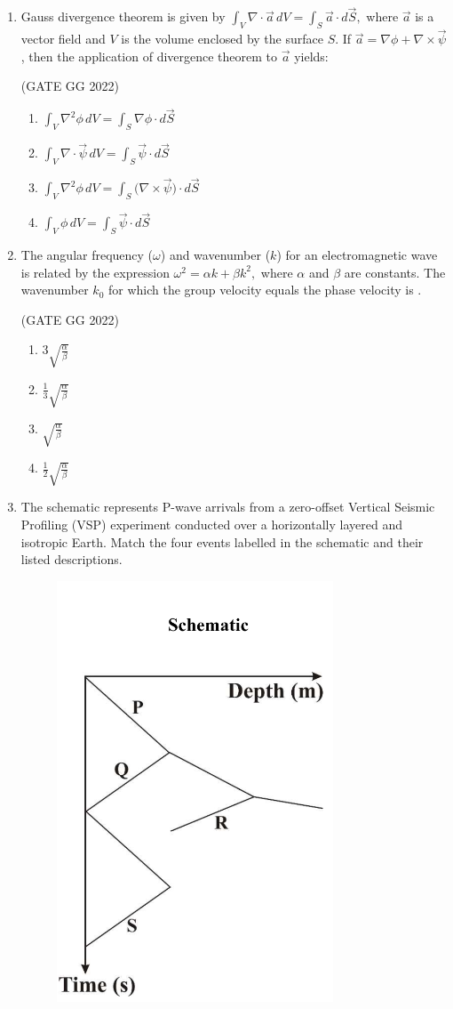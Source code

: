\documentclass[journal]{IEEEtran}
\begin{document}
\begin{enumerate}
\item Gauss divergence theorem is given by  
$\int_V \nabla \cdot \vec{a} \, dV = \int_S \vec{a} \cdot d\vec{S},
$ where $\vec{a}$ is a vector field and $V$ is the volume enclosed by the surface $S$.  If $\vec{a} = \nabla \phi + \nabla \times \vec{\psi}$, then the application of divergence theorem to $\vec{a}$ yields:  

\hfill(GATE GG 2022)
\begin{enumerate}
\item $\int_V \nabla^2 \phi \, dV = \int_S \nabla \phi \cdot d\vec{S}$  
\item $\int_V \nabla \cdot \vec{\psi} \, dV = \int_S \vec{\psi} \cdot d\vec{S}$  
\item $\int_V \nabla^2 \phi \, dV = \int_S \big(\nabla \times \vec{\psi}\big)\cdot d\vec{S}$  
\item $\int_V \phi \, dV = \int_S \vec{\psi}\cdot d\vec{S}$  
\end{enumerate}

\item The angular frequency ($\omega$) and wavenumber ($k$) for an electromagnetic wave is related by the expression  
$\omega^2 = \alpha k + \beta k^2,$ where $\alpha$ and $\beta$ are constants.  
The wavenumber $k_0$ for which the group velocity equals the phase velocity is \makebox[2cm]{\hrulefill}.  

\hfill(GATE GG 2022)
\begin{enumerate}
\item $3\sqrt{\frac{\alpha}{\beta}}$  
\item $\frac{1}{3}\sqrt{\frac{\alpha}{\beta}}$  
\item $\sqrt{\frac{\alpha}{\beta}}$  
\item $\frac{1}{2}\sqrt{\frac{\alpha}{\beta}}$  
\end{enumerate}

\item The schematic represents P-wave arrivals from a zero-offset Vertical Seismic Profiling (VSP) experiment conducted over a horizontally layered and isotropic Earth. Match the four events labelled in the schematic and their listed descriptions.  
\begin{figure}[H]
\centering
\includegraphics[width = 0.19\columnwidth]{figs/16.png}
\caption*{}
\label{fig:q5}
\end{figure}
\begin{tabular}{ l l }


\end{tabular}
\end{enumerate}
\end{document}
